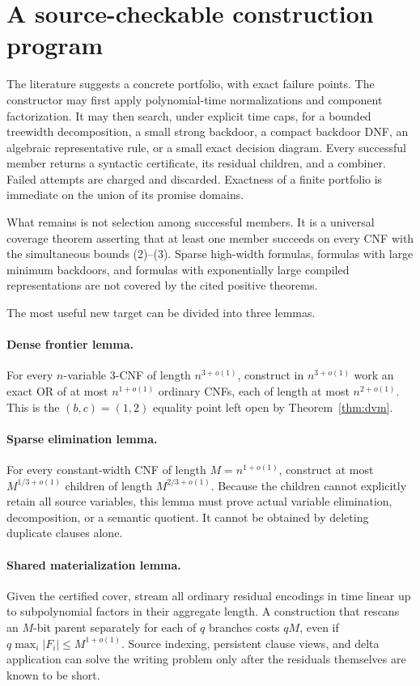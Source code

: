 \documentclass[11pt]{article}
\begin{document}
\section{A source-checkable construction program}

The literature suggests a concrete portfolio, with exact failure points.
The constructor may first apply polynomial-time normalizations and component
factorization.  It may then search, under explicit time caps, for a bounded
treewidth decomposition, a small strong backdoor, a compact backdoor DNF,
an algebraic representative rule, or a small exact decision diagram.  Every
successful member returns a syntactic certificate, its residual children,
and a combiner.  Failed attempts are charged and discarded.  Exactness of a
finite portfolio is immediate on the union of its promise domains.

What remains is not selection among successful members.  It is a universal
coverage theorem asserting that at least one member succeeds on every CNF
with the simultaneous bounds (2)--(3).  Sparse high-width formulas, formulas
with large minimum backdoors, and formulas with exponentially large compiled
representations are not covered by the cited positive theorems.

The most useful new target can be divided into three lemmas.

\paragraph{Dense frontier lemma.}
For every $n$-variable $3$-CNF of length $n^{3+o(1)}$, construct in
$n^{3+o(1)}$ work an exact OR of at most $n^{1+o(1)}$ ordinary CNFs, each of
length at most $n^{2+o(1)}$.  This is the $(b,c)=(1,2)$ equality point left
open by Theorem~\ref{thm:dvm}.

\paragraph{Sparse elimination lemma.}
For every constant-width CNF of length $M=n^{1+o(1)}$, construct at most
$M^{1/3+o(1)}$ children of length $M^{2/3+o(1)}$.  Because the children
cannot explicitly retain all source variables, this lemma must prove actual
variable elimination, decomposition, or a semantic quotient.  It cannot be
obtained by deleting duplicate clauses alone.

\paragraph{Shared materialization lemma.}
Given the certified cover, stream all ordinary residual encodings in time
linear up to subpolynomial factors in their aggregate length.  A construction
that rescans an $M$-bit parent separately for each of $q$ branches costs
$qM$, even if $q\max_i|F_i|\le M^{1+o(1)}$.  Source indexing, persistent
clause views, and delta application can solve the writing problem only after
the residuals themselves are known to be short.
\end{document}
